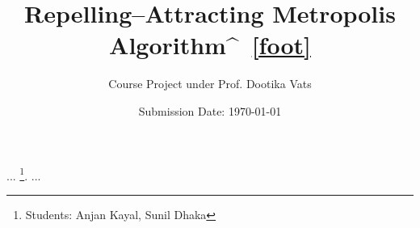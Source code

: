 \documentclass{article}
\title{Repelling–Attracting Metropolis Algorithm^{~\ref{foot}}}
\author{Course Project under Prof. Dootika Vats}
\date{Submission Date: \today}
\begin{document}
...
\footnote{\label{foot}Students: Anjan Kayal, Sunil Dhaka}.
...
\end{document}
